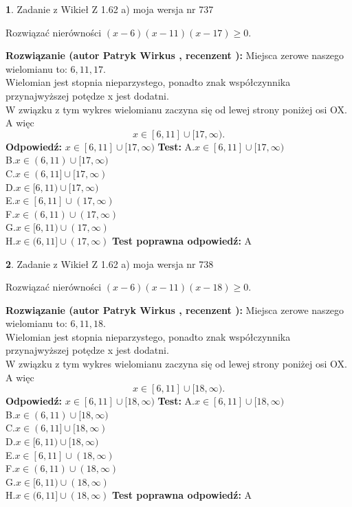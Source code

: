 \documentclass[12pt, a4paper]{article}
\theoremstyle{definition} %
\newtheorem{zad}{}
\newcommand{\zadStart}[1]{\begin{zad}#1\newline}
\newcommand{\zadStop}{\end{zad}}
\newcommand{\rozwStart}[2]{\noindent \textbf{Rozwiązanie (autor #1 , recenzent #2): }\newline}
\newcommand{\rozwStop}{\newline}
\newcommand{\odpStart}{\noindent \textbf{Odpowiedź:}\newline}
\newcommand{\odpStop}{\newline}
\newcommand{\testStart}{\noindent \textbf{Test:}\newline}
\newcommand{\testStop}{\newline}
\newcommand{\kluczStart}{\noindent \textbf{Test poprawna odpowiedź:}\newline}
\newcommand{\kluczStop}{\newline}
\begin{document}
\zadStart{Zadanie z Wikieł Z 1.62 a) moja wersja nr 737}

Rozwiązać nierówności $(x-6)(x-11)(x-17)\ge0$.
\zadStop
\rozwStart{Patryk Wirkus}{}
Miejsca zerowe naszego wielomianu to: $6, 11, 17$.\\
Wielomian jest stopnia nieparzystego, ponadto znak współczynnika przy\linebreak najwyższej potędze x jest dodatni.\\ W związku z tym wykres wielomianu zaczyna się od lewej strony poniżej osi OX. A więc $$x \in [6,11] \cup [17,\infty).$$
\rozwStop
\odpStart
$x \in [6,11] \cup [17,\infty)$
\odpStop
\testStart
A.$x \in [6,11] \cup [17,\infty)$\\
B.$x \in (6,11) \cup [17,\infty)$\\
C.$x \in (6,11] \cup [17,\infty)$\\
D.$x \in [6,11) \cup [17,\infty)$\\
E.$x \in [6,11] \cup (17,\infty)$\\
F.$x \in (6,11) \cup (17,\infty)$\\
G.$x \in [6,11) \cup (17,\infty)$\\
H.$x \in (6,11] \cup (17,\infty)$
\testStop
\kluczStart
A
\kluczStop



\zadStart{Zadanie z Wikieł Z 1.62 a) moja wersja nr 738}

Rozwiązać nierówności $(x-6)(x-11)(x-18)\ge0$.
\zadStop
\rozwStart{Patryk Wirkus}{}
Miejsca zerowe naszego wielomianu to: $6, 11, 18$.\\
Wielomian jest stopnia nieparzystego, ponadto znak współczynnika przy\linebreak najwyższej potędze x jest dodatni.\\ W związku z tym wykres wielomianu zaczyna się od lewej strony poniżej osi OX. A więc $$x \in [6,11] \cup [18,\infty).$$
\rozwStop
\odpStart
$x \in [6,11] \cup [18,\infty)$
\odpStop
\testStart
A.$x \in [6,11] \cup [18,\infty)$\\
B.$x \in (6,11) \cup [18,\infty)$\\
C.$x \in (6,11] \cup [18,\infty)$\\
D.$x \in [6,11) \cup [18,\infty)$\\
E.$x \in [6,11] \cup (18,\infty)$\\
F.$x \in (6,11) \cup (18,\infty)$\\
G.$x \in [6,11) \cup (18,\infty)$\\
H.$x \in (6,11] \cup (18,\infty)$
\testStop
\kluczStart
A
\kluczStop
\end{document}
